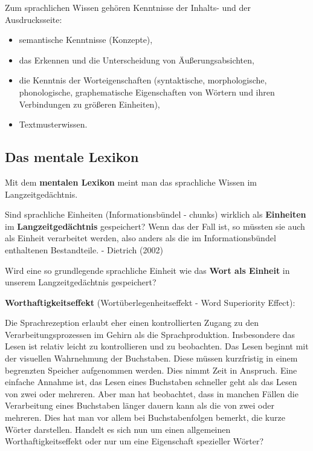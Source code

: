\documentclass[
  letterpaper,
]{scrbook}
\begin{document}
Zum sprachlichen Wissen gehören Kenntnisse der Inhalts- und der
Ausdrucksseite:

\begin{itemize}
\item
  semantische Kenntnisse (Konzepte),
\item
  das Erkennen und die Unterscheidung von Äußerungsabsichten,
\item
  die Kenntnis der Worteigenschaften (syntaktische, morphologische,
  phonologische, graphematische Eigenschaften von Wörtern und ihren
  Verbindungen zu größeren Einheiten),
\item
  Textmusterwissen.
\end{itemize}

\hypertarget{das-mentale-lexikon}{%
\subsection{Das mentale Lexikon}\label{das-mentale-lexikon}}

Mit dem \textbf{mentalen Lexikon} meint man das sprachliche Wissen im
Langzeitgedächtnis.

Sind sprachliche Einheiten (Informationsbündel - chunks) wirklich als
\textbf{Einheiten} im \textbf{Langzeitgedächtnis} gespeichert? Wenn das
der Fall ist, so müssten sie auch als Einheit verarbeitet werden, also
anders als die im Informationsbündel enthaltenen Bestandteile. -
Dietrich (2002)

Wird eine so grundlegende sprachliche Einheit wie das \textbf{Wort als
Einheit} in unserem Langzeitgedächtnis gespeichert?

\textbf{Worthaftigkeitseffekt} (Wortüberlegenheitseffekt - Word
Superiority Effect):

Die Sprachrezeption erlaubt eher einen kontrollierten Zugang zu den
Verarbeitungsprozessen im Gehirn als die Sprachproduktion. Insbesondere
das Lesen ist relativ leicht zu kontrollieren und zu beobachten. Das
Lesen beginnt mit der visuellen Wahrnehmung der Buchstaben. Diese müssen
kurzfristig in einem begrenzten Speicher aufgenommen werden. Dies nimmt
Zeit in Anspruch. Eine einfache Annahme ist, das Lesen eines Buchstaben
schneller geht als das Lesen von zwei oder mehreren. Aber man hat
beobachtet, dass in manchen Fällen die Verarbeitung eines Buchstaben
länger dauern kann als die von zwei oder mehreren. Dies hat man vor
allem bei Buchstabenfolgen bemerkt, die kurze Wörter darstellen. Handelt
es sich nun um einen allgemeinen Worthaftigkeitseffekt oder nur um eine
Eigenschaft spezieller Wörter?
\end{document}
